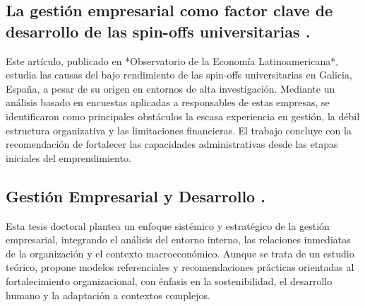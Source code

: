 \subsection{La gestión empresarial como factor clave de desarrollo de las spin-offs universitarias \cite{Rodeiro2012}.}

Este artículo, publicado en *Observatorio de la Economía Latinoamericana*, estudia las causas del bajo rendimiento de las spin-offs universitarias en Galicia, España, a pesar de su origen en entornos de alta investigación. Mediante un análisis basado en encuestas aplicadas a responsables de estas empresas, se identificaron como principales obstáculos la escasa experiencia en gestión, la débil estructura organizativa y las limitaciones financieras. El trabajo concluye con la recomendación de fortalecer las capacidades administrativas desde las etapas iniciales del emprendimiento.

\subsection{Gestión Empresarial y Desarrollo \cite{Reyes12}.}

Esta tesis doctoral plantea un enfoque sistémico y estratégico de la gestión empresarial, integrando el análisis del entorno interno, las relaciones inmediatas de la organización y el contexto macroeconómico. Aunque se trata de un estudio teórico, propone modelos referenciales y recomendaciones prácticas orientadas al fortalecimiento organizacional, con énfasis en la sostenibilidad, el desarrollo humano y la adaptación a contextos complejos.



